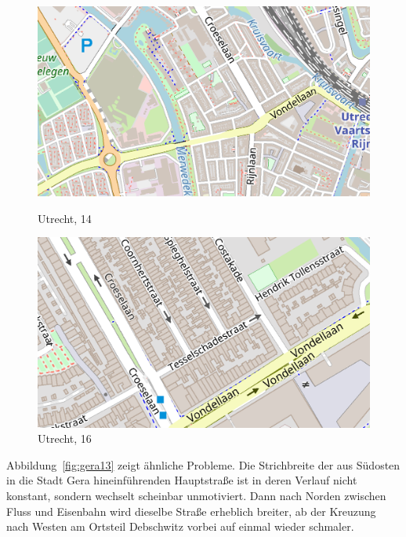\documentclass[../main/thesis.tex]{subfiles}
\begin{document}
\begin{figure}[ht]
  \begin{minipage}[t]{.5\linewidth}
    \centering
    \includegraphics[width=\ScaleIfNeeded]{../chapter2/utrecht-z14}
    \caption{Utrecht,  14}\label{fig:utrecht14}
  \end{minipage}%
  \begin{minipage}[t]{.5\linewidth}
    \centering
    \includegraphics[width=\ScaleIfNeeded]{../chapter2/utrecht-z16}
    \caption{Utrecht,  16}\label{fig:utrecht16}
  \end{minipage}
\end{figure}


Abbildung~\ref{fig:gera13} zeigt ähnliche Probleme.
Die Strichbreite der aus Südosten in die Stadt Gera hineinführenden Hauptstraße ist in deren Verlauf nicht konstant, sondern wechselt scheinbar unmotiviert.
Dann nach Norden zwischen Fluss und Eisenbahn wird dieselbe Straße erheblich breiter, ab der Kreuzung nach Westen am Ortsteil Debschwitz vorbei auf einmal wieder schmaler.
\end{document}
